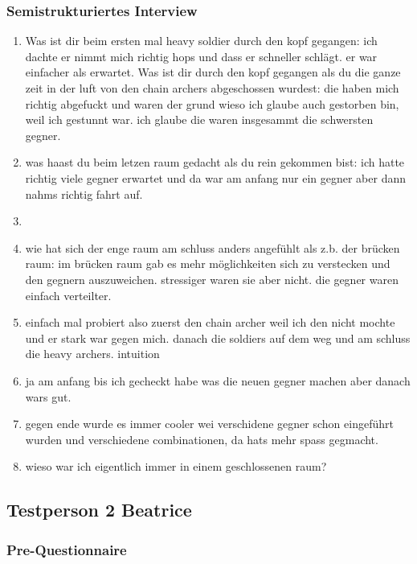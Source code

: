 \documentclass[../Main.tex]{subfiles}
\begin{document}
\subsubsection{Semistrukturiertes Interview}

\begin{enumerate}[label=\textbf{I\arabic*}, leftmargin=1.5cm, itemsep=1em]
    \item Was ist dir beim ersten mal heavy soldier durch den kopf gegangen: ich dachte er nimmt mich richtig hops und dass er schneller schlägt. er war einfacher als erwartet. Was ist dir durch den kopf gegangen als du die ganze zeit in der luft von den chain archers abgeschossen wurdest: die haben mich richtig abgefuckt und waren der grund wieso ich glaube auch gestorben bin, weil ich gestunnt war. ich glaube die waren insgesammt die schwersten gegner.
    \item was haast du beim letzen raum gedacht als du rein gekommen bist: ich hatte richtig viele gegner erwartet und da war am anfang nur ein gegner aber dann nahms richtig fahrt auf.

    \item
    \item wie hat sich der enge raum am schluss anders angefühlt als z.b. der brücken raum: im brücken raum gab es mehr möglichkeiten sich zu verstecken und den gegnern auszuweichen. stressiger waren sie aber nicht. die gegner waren einfach verteilter.

    \item einfach mal probiert also zuerst den chain archer weil ich den nicht mochte und er stark war gegen mich. danach die soldiers auf dem weg und am schluss die heavy archers. intuition
    \item ja am anfang bis ich gecheckt habe was die neuen gegner machen aber danach wars gut.

    \item gegen ende wurde es immer cooler wei verschidene gegner schon eingeführt wurden und verschiedene combinationen, da hats mehr spass gegmacht.

    \item wieso war ich eigentlich immer in einem geschlossenen raum?
\end{enumerate}

\subsection{Testperson 2 Beatrice}

\subsubsection{Pre-Questionnaire}
\end{document}
